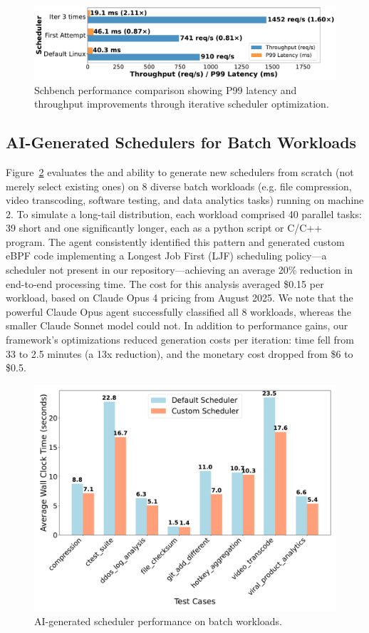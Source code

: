 \begin{figure}[h]
\centering
\includegraphics[width=0.9\columnwidth]{sections/schbench_performance_comparison.pdf}
\caption{Schbench performance comparison showing P99 latency and throughput improvements through iterative scheduler optimization.}
\label{fig:schbench-comparison}
\end{figure}

\subsection{AI-Generated Schedulers for Batch Workloads}

Figure~\ref{fig:batch-performance} evaluates the \sys  and \agent  ability to generate new schedulers from scratch (not merely select existing ones) on 8 diverse batch workloads (e.g. file compression, video transcoding, software testing, and data analytics tasks) running on machine 2. To simulate a long-tail distribution, each workload comprised 40 parallel tasks: 39 short and one significantly longer, each as a python script or C/C++ program. The agent consistently identified this pattern and generated custom eBPF code implementing a Longest Job First (LJF) scheduling policy—a scheduler not present in our repository—achieving an average 20\% reduction in end-to-end processing time. The cost for this analysis averaged \$0.15 per workload, based on Claude Opus 4 pricing from August 2025. We note that the powerful Claude Opus agent successfully classified all 8 workloads, whereas the smaller Claude Sonnet model could not. In addition to performance gains, our framework's optimizations reduced generation costs per iteration: time fell from 33 to 2.5 minutes (a 13x reduction), and the monetary cost dropped from \$6 to \$0.5.

\begin{figure}[h]
\centering
\includegraphics[width=0.9\columnwidth]{sections/scheduler_performance_comparison.pdf}
\caption{AI-generated scheduler performance on batch workloads.}
\label{fig:batch-performance}
\end{figure}


